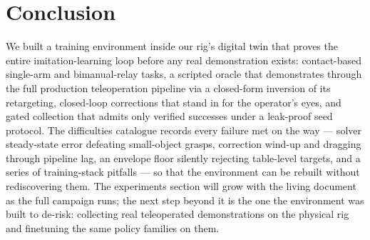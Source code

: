 \section{Conclusion}
\label{sec:conclusion}

We built a training environment inside our rig's digital twin that
proves the entire imitation-learning loop before any real demonstration
exists: contact-based single-arm and bimanual-relay tasks, a scripted
oracle that demonstrates through the full production teleoperation
pipeline via a closed-form inversion of its retargeting, closed-loop
corrections that stand in for the operator's eyes, and gated collection
that admits only verified successes under a leak-proof seed protocol.
The difficulties catalogue records every failure met on the way ---
solver steady-state error defeating small-object grasps, correction
wind-up and dragging through pipeline lag, an envelope floor silently
rejecting table-level targets, and a series of training-stack pitfalls
--- so that the environment can be rebuilt without rediscovering them.
The experiments section will grow with the living document as the full
campaign runs; the next step beyond it is the one the environment was
built to de-risk: collecting real teleoperated demonstrations on the
physical rig and finetuning the same policy families on them.
